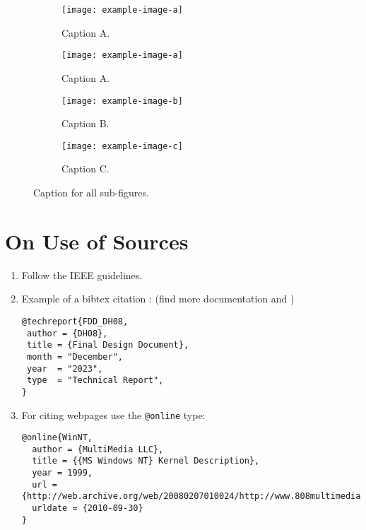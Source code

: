\begin{figure}[h]
    \centering
    \begin{subfigure}{0.3\textwidth} %
    \centering
    \texttt{[image: example-image-a]} %
    \caption{Caption A.}            %
    \label{subfig:subfig-example-a} %
    \end{subfigure}

    \begin{subfigure}{0.2\textwidth}
    \centering
    \texttt{[image: example-image-a]}
    \caption{Caption A.}
    \label{subfig:subfig-example-a-repeated}
    \end{subfigure}
    \hfill %
    \begin{subfigure}{0.2\textwidth}
    \centering
    \texttt{[image: example-image-b]}
    \caption{Caption B.}
    \label{subfig:subfig-example-b}
    \end{subfigure}
    \hfill 
    \begin{subfigure}{0.2\textwidth}
    \centering
    \texttt{[image: example-image-c]}
    \caption{Caption C.}
    \label{subfig:subfig-example-c}
    \end{subfigure}

    \caption{Caption for all sub-figures.}  %
    \label{fig:subfig-example}              %
\end{figure}

\section*{On Use of Sources}
\begin{enumerate}[label=SO.\arabic*]
    \item Follow the IEEE guidelines.
    \item Example of a bibtex citation \cite{WinNT}: (find more documentation \href{https://bibtex.eu/types/}{} and \href{https://www.overleaf.com/learn/latex/Bibliography_management_with_bibtex}{})

\begin{verbatim}
@techreport{FDD_DH08, 
 author = {DH08}, 
 title = {Final Design Document}, 
 month = "December", 
 year  = "2023", 
 type  = "Technical Report", 
}
\end{verbatim}
    \item For citing webpages use the \verb|@online| type:
    \begin{verbatim}
@online{WinNT,
  author = {MultiMedia LLC},
  title = {{MS Windows NT} Kernel Description},
  year = 1999,
  url = {http://web.archive.org/web/20080207010024/http://www.808multimedia.com/winnt/kernel.htm},
  urldate = {2010-09-30}
}
\end{verbatim}
\end{enumerate}
